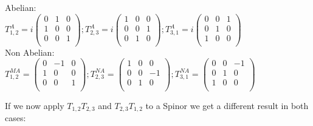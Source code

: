 \documentclass[Master]{subfiles}
\begin{document}
\begin{center}
Abelian:\\ \vspace*{3mm} 
\begin{math}
T^A_{1,2}=i\left(
\begin{array}{ccc}
 0 & 1 & 0 \\
 1 & 0 & 0 \\
 0 & 0 & 1 \\
\end{array}
\right);
T^A_{2,3}=i\left(
\begin{array}{ccc}
 1 & 0 & 0 \\
 0 & 0 & 1 \\
 0 & 1 & 0 \\
\end{array}
\right);
T^A_{3,1}=i\left(
\begin{array}{ccc}
 0 & 0 & 1 \\
 0 & 1 & 0 \\
 1 & 0 & 0 \\
\end{array}
\right)
\end{math}
\vspace{5mm}  \\ 
Non Abelian:   \\ \vspace*{3mm} 
\begin{math}
T^{MA}_{1,2}=\left(
\begin{array}{ccc}
 0 & -1 & 0 \\
 1 & 0 & 0 \\
 0 & 0 & 1 \\
\end{array}
\right);
T^{NA}_{2,3}=\left(
\begin{array}{ccc}
 1 & 0 & 0 \\
 0 & 0 &- 1 \\
 0 & 1 & 0 \\
\end{array}
\right);
T^{NA}_{3,1}=\left(
\begin{array}{ccc}
 0 & 0 & -1 \\
 0 & 1 & 0 \\
 1 & 0 & 0 \\
\end{array}
\right)
\end{math}\\
\end{center}
If we now apply $T_{1,2}T_{2,3}$ and $T_{2,3}T_{1,2}$ to a Spinor we get a different result in both cases:\\
\end{document}

